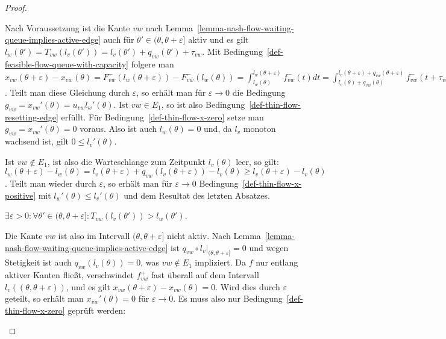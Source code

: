 \begin{proof}
\begin{description}[leftmargin=0cm, topsep=0cm, itemindent=0.5cm]
		Nach Voraussetzung ist die Kante ${vw}$ nach Lemma~\ref{lemma-nash-flow-waiting-queue-implies-active-edge} auch für $\theta'\in  (\theta, \theta + \varepsilon ]$ aktiv und es gilt $l_w(\theta') = T_{vw}(l_v(\theta')) = l_v(\theta') + q_{vw}(\theta') + \tau_{vw}$.
		Mit Bedingung~\ref{def-feasible-flow-queue-with-capacity} folgere man $x_{vw}(\theta + \varepsilon) - x_{vw}(\theta) = F_{vw}^-(l_w(\theta + \varepsilon)) - F_{vw}^-(l_w(\theta))
		= \int_{l_w(\theta)}^{l_w(\theta + \varepsilon)} f_{vw}^-(t) dt
		= \int_{l_v(\theta) + q_{vw}(\theta)}^{l_v(\theta + \varepsilon) + q_{vw}(\theta + \varepsilon)} f_{vw}^-(t + \tau_{vw}) dt
		= u_{vw} (l_w(\theta + \varepsilon) - l_w(\theta))$.
		Teilt man diese Gleichung durch $\varepsilon$, so erhält man für $\varepsilon\rightarrow 0$ die Bedingung $g_{vw} = x_{vw}'(\theta) = u_{vw} l_w'(\theta)$.
		Ist $vw\in E_1$, so ist also Bedingung~\ref{def-thin-flow-resetting-edge} erfüllt.
		Für Bedingung~\ref{def-thin-flow-x-zero} setze man $g_{vw}=x_{vw}'(\theta)=0$ voraus.
		Also ist auch $l_w(\theta)=0$ und, da $l_v$ monoton wachsend ist, gilt $0 \leq l_v'(\theta)$.

		Ist $vw\notin E_1$, ist also die Warteschlange zum Zeitpunkt $l_v(\theta)$ leer, so gilt: $l_w(\theta+\varepsilon) - l_w(\theta) = l_v(\theta + \varepsilon) + q_{vw}(l_v(\theta + \varepsilon)) - l_v(\theta) \geq l_v(\theta + \varepsilon) - l_v(\theta)$.
		Teilt man wieder durch $\varepsilon$, so erhält man für $\varepsilon  \rightarrow 0$ Bedingung~\ref{def-thin-flow-x-positive} mit $l_w'(\theta) \leq l_v'(\theta)$ und dem Resultat des letzten Absatzes.
		
		\item[2. Fall:] $\exists \varepsilon > 0: \forall \theta'\in(\theta, \theta + \varepsilon]: T_{vw}(l_v(\theta'))>l_w(\theta')$.
		
		Die Kante ${vw}$ ist also im Intervall $(\theta, \theta + \varepsilon]$ nicht aktiv.
		Nach Lemma~\ref{lemma-nash-flow-waiting-queue-implies-active-edge} ist $q_{vw} \circ l_v\big|_{(\theta, \theta+\varepsilon]}=0$ und wegen Stetigkeit ist auch $q_{vw}(l_v(\theta))=0$, was $vw\notin E_1$ impliziert.
		Da $f$ nur entlang aktiver Kanten fließt, verschwindet $f_{vw}^+$ fast überall auf dem Intervall $l_v((\theta, \theta+\varepsilon))$, und es gilt $x_{vw}(\theta + \varepsilon) - x_{vw}(\theta)=0$.
		Wird dies durch $\varepsilon$ geteilt, so erhält man $x_{vw}'(\theta) = 0$ für $\varepsilon\rightarrow0$.
		Es muss also nur Bedingung~\ref{def-thin-flow-x-zero} geprüft werden:
		

\end{description}
\end{proof}
